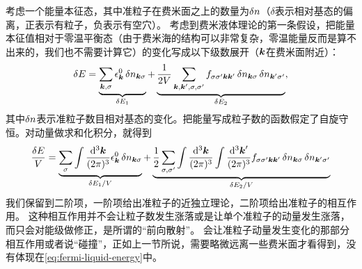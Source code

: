 考虑一个能量本征态，其中准粒子在费米面之上的数量为$\var{n}$（$\delta$表示相对基态的偏离，正表示有粒子，负表示有空穴）。
考虑到费米液体理论的第一条假设，把能量本征值相对于零温平衡态（由于费米海的结构可以非常复杂，零温能量反而是算不出来的，我们也不需要计算它）的变化写成以下级数展开（$\vb*{k}$在费米面附近）：
\begin{equation}
    \var{E} = \underbrace{\sum_{\vb*{k}, \sigma} \epsilon^0_{\vb*{k}} \var{n_{\vb*{k} \sigma}}}_{\var{E_1}} + \underbrace{\frac{1}{2V} \sum_{\vb*{k}, \vb*{k}', \sigma, \sigma'} f_{\sigma \sigma' \vb*{k} \vb*{k}'} \var{n_{\vb*{k} \sigma}} \var{n_{\vb*{k}' \sigma'}}}_{\var{E_2}},
    \label{eq:fermi-liquid-energy}
\end{equation}
其中$\var{n}$表示准粒子数目相对基态的变化。把能量写成粒子数的函数假定了自旋守恒。对动量做求和化积分，就得到
\begin{equation}
    \frac{\var{E}}{V} = \underbrace{\sum_{\sigma} \int \frac{\dd[3]{\vb*{k}}}{(2\pi)^3} \epsilon^0_{\vb*{k}} \var{n_{\vb*{k} \sigma}}}_{\var{E_1} / V} + \underbrace{\frac{1}{2} \sum_{\sigma, \sigma'} \int \frac{\dd[3]{\vb*{k}}}{(2\pi)^3} \int \frac{\dd[3]{\vb*{k}'}}{(2\pi)^3} f_{\sigma \sigma' \vb*{k} \vb*{k}'} \var{n_{\vb*{k} \sigma}} \var{n_{\vb*{k}' \sigma'}}}_{\var{E_2} / V}
\end{equation}
我们保留到二阶项，一阶项给出准粒子的近独立理论，二阶项给出准粒子的相互作用。
这种相互作用并不会让粒子数发生涨落或是让单个准粒子的动量发生涨落，而只会对能级做修正，是所谓的“前向散射”。
会让准粒子动量发生变化的那部分相互作用或者说“碰撞”，正如上一节所说，需要略微远离一些费米面才看得到，没有体现在\eqref{eq:fermi-liquid-energy}中。

